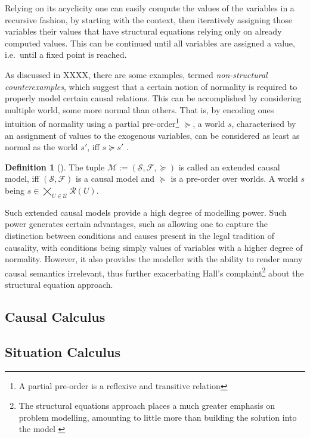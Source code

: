 \documentclass[11pt,a4paper]{book}
\theoremstyle{definition}
\newtheorem{definition}{Definition}[section]
\theoremstyle{definition}
\theoremstyle{definition}
\theoremstyle{remark}
\newcommand{\cmodel}{\mathcal{M}}
\newcommand{\csig}{\mathcal{S}}
\newcommand{\cfoos}{\mathcal{F}}
\newcommand{\crange}{\mathcal{R}}
\newcommand{\cexvars}{\mathcal{U}}
\begin{document}
Relying on its acyclicity one can easily compute the values of the variables in a recursive fashion, by starting with the context, then iteratively assigning those variables their values that have structural equations relying only on already computed values. This can be continued until all variables are assigned a value, i.e.\ until a fixed point is reached.



As discussed in XXXX, there are some examples, termed \emph{non-structural counterexamples}, which suggest that a certain notion of normality is required to properly model certain causal relations.
This can be accomplished by considering multiple world, some more normal than others. That is, by encoding ones intuition of normality using a partial pre-order\footnote{A partial pre-order is a reflexive and transitive relation} $\succeq$, a world $s$, characterised by an assignment of values to the exogenous variables, can be considered as least as normal as the world $s'$, iff $s \succeq s'$ \cite{halpern2015cause}.

\begin{definition}[\cite{halpern2015cause}]
The tuple $\cmodel:= (\csig, \cfoos, \succeq)$ is called an extended causal model, iff $(\csig, \cfoos)$ is a causal model and $\succeq$ is a pre-order over worlds. A
world $s$ being $s \in   \bigtimes_{U \in \cexvars} \crange(U)$.
\end{definition}


Such extended causal models provide a high degree of modelling power. Such power generates certain advantages, such as allowing one to capture the distinction between conditions and causes present in the legal tradition of causality, with conditions being simply values of variables with a higher degree of normality. However, it also provides the modeller with the ability to render many causal semantics irrelevant, thus further exacerbating Hall's complaint\footnote{The structural equations approach places a much greater emphasis on problem modelling, amounting to little more than building the solution into the model \cite{erwig2010causal}} about the structural equation approach. 

\subsection{Causal Calculus}



\subsection{Situation Calculus}
\end{document}
